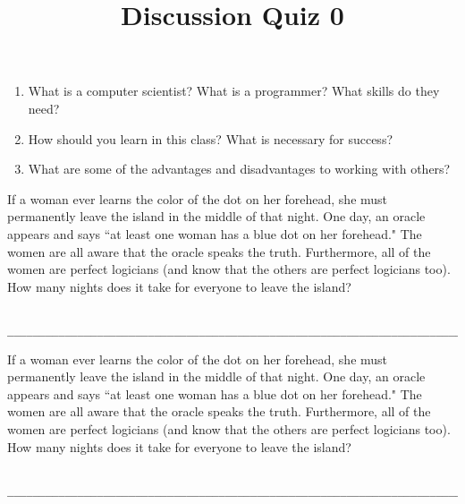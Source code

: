 \documentclass[twoside]{article}
\title{\sc Discussion Quiz 0}
\begin{document}
\maketitle

\begin{enumerate}
\begin{enumerate}
\item What is a computer scientist? What is a programmer? What skills do they need?
\vspace{2.3cm}
\item How should you learn in this class? What is necessary for success?
\vspace{2.3cm}
\item What are some of the advantages and disadvantages to working with others?
\vspace{2.3cm}
\end{enumerate}

 \newline\newline If a woman ever learns the color of the dot on her forehead, she must permanently leave the island in the middle of that night. \newline\newline One day, an oracle appears and says ``at least one woman has a blue dot on her forehead." The women are all aware that the oracle speaks the truth. Furthermore, all of the women are perfect logicians (and know that the others are perfect logicians too). How many nights does it take for everyone to leave the island?

\begin{lstlisting}

__________________________________________________________________________
\end{lstlisting}

 \newline\newline If a woman ever learns the color of the dot on her forehead, she must permanently leave the island in the middle of that night. \newline\newline One day, an oracle appears and says ``at least one woman has a blue dot on her forehead." The women are all aware that the oracle speaks the truth. Furthermore, all of the women are perfect logicians (and know that the others are perfect logicians too). How many nights does it take for everyone to leave the island?

\begin{lstlisting}

__________________________________________________________________________
\end{lstlisting}

\end{enumerate}
\end{document}

